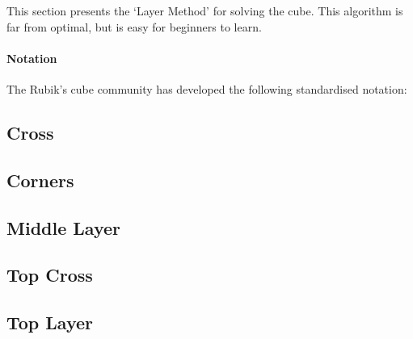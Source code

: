 This section presents the `Layer Method' for solving the cube. This algorithm is far from optimal, but is easy for beginners to learn.

\paragraph{Notation} The Rubik's cube community has developed the following standardised notation:


\subsection{Cross}

\subsection{Corners}

\subsection{Middle Layer}

\subsection{Top Cross}

\subsection{Top Layer}